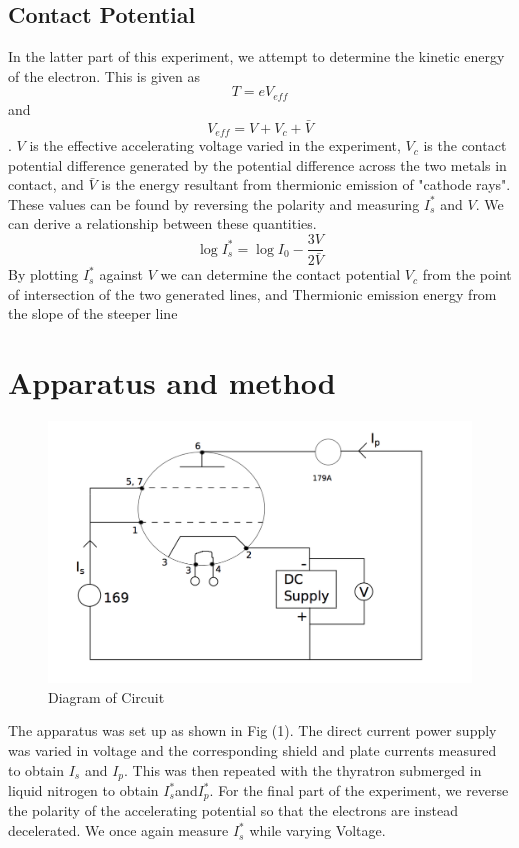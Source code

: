 \documentclass{article}
\begin{document}
\subsection*{Contact Potential}
In the latter part of this experiment, we attempt to determine the kinetic energy of the electron. This is given as 
\[T = eV_{eff}\] and
\[V_{eff} = V + V_c + \bar{V}\]. $V$ is the effective accelerating voltage varied in the experiment, $V_c$ is the contact potential difference generated by the potential difference across the two metals in contact, and $\bar{V}$ is the energy resultant from thermionic emission of "cathode rays". These values can be found by reversing the polarity and measuring $I_s^*$ and $V$. We can derive a relationship between these quantities.
\[\log{I_s^*} = \log{I_0} - \frac{3V}{2\bar{V}}\]
By plotting $I_s^*$ against $V$ we can determine the contact potential $V_c$ from the point of intersection of the two generated lines, and Thermionic emission energy from the slope of the steeper line

\section*{Apparatus and method}
\begin{figure}[H]
    \centering
    \includegraphics[scale = 0.25]{diagram.png}
    \caption{Diagram of Circuit}
    \label{fig:apparatus}
\end{figure}
The apparatus was set up as shown in Fig (1). The direct current power supply was varied in voltage and the corresponding shield and plate currents measured to obtain $I_s$ and $I_p$. This was then repeated with the thyratron submerged in liquid nitrogen to obtain $I_s^* $and$ I_p^*$. For the final part of the experiment, we reverse the polarity of the accelerating potential so that the electrons are instead decelerated. We once again measure $I_s^*$ while varying Voltage.
\end{document}
